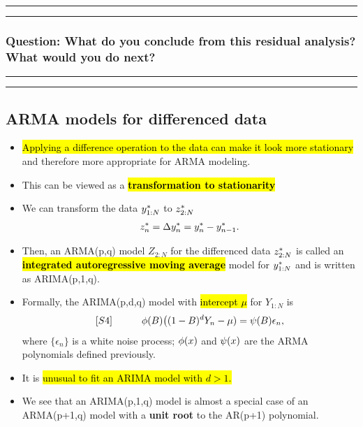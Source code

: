 \documentclass[]{article}
\begin{document}
\begin{center}\rule{0.5\linewidth}{\linethickness}\end{center}

\begin{center}\rule{0.5\linewidth}{\linethickness}\end{center}

\subsubsection{Question: What do you conclude from this residual
analysis? What would you do
next?}\label{question-what-do-you-conclude-from-this-residual-analysis-what-would-you-do-next}


\begin{center}\rule{0.5\linewidth}{\linethickness}\end{center}

\begin{center}\rule{0.5\linewidth}{\linethickness}\end{center}

\subsection{ARMA models for differenced
data}\label{arma-models-for-differenced-data}

\begin{itemize}
\item
  \hl{Applying a difference operation to the data can make it look more
  stationary} and therefore more appropriate for ARMA modeling.
\item
  This can be viewed as a \hl{\textbf{transformation to stationarity}}
\item
  We can transform the data \(y_{1:N}^*\) to \(z_{2:N}^*\)
  \[ z_n^* = \Delta y_n^* = y_n^*-y_{n-1}^*.\]
\item
  Then, an ARMA(p,q) model \(Z_{2:N}\) for the differenced data
  \(z_{2:N}^*\) is called an \hl{\textbf{integrated autoregressive
  moving average}} model for \(y_{1:N}^*\) and is written as
  ARIMA(p,1,q).
\item
  Formally, the ARIMA(p,d,q) model with \hl{intercept $\mu$} for
  \(Y_{1:N}\) is
  \[[S4] \quad\quad\quad \phi(B)\big( (1-B)^d Y_n-\mu) = \psi(B) \epsilon_n,\]
  where \(\{\epsilon_n\}\) is a white noise process; \(\phi(x)\) and
  \(\psi(x)\) are the ARMA polynomials defined previously.
\item
  It is \hl{unusual to fit an ARIMA model with $d>1$.}
\item
  We see that an ARIMA(p,1,q) model is almost a special case of an
  ARMA(p+1,q) model with a \textbf{unit root} to the AR(p+1) polynomial.
\end{itemize}
\end{document}
